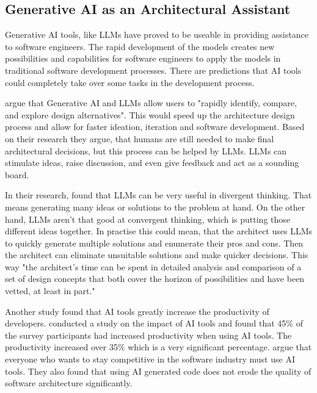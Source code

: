 \subsection{Generative AI as an Architectural Assistant}
Generative AI tools, like LLMs have proved to be useable in providing assistance to software engineers. The rapid development of the models creates new possibilities and capabilities for software engineers to apply the models in traditional software development processes. There are predictions that AI tools could completely take over some tasks in the development process. \parencite{welshEndProgramming2023}

\textcite{cervantesLLMsAssistantsSoftware2026} argue that Generative AI and LLMs allow users to "rapidly identify, compare, and explore design alternatives". This would speed up the architecture design process and allow for faster ideation, iteration and software development. Based on their research they argue, that humans are still needed to make final architectural decisions, but this process can be helped by LLMs. LLMs can stimulate ideas, raise discussion, and even give feedback and act as a sounding board.

In their research, \citeauthor{cervantesLLMsAssistantsSoftware2026} found that LLMs can be very useful in divergent thinking. That means generating many ideas or solutions to the problem at hand. On the other hand, LLMs aren't that good at convergent thinking, which is putting those different ideas together. In practise this could mean, that the architect uses LLMs to quickly generate multiple solutions and enumerate their pros and cons. Then the architect can eliminate unsuitable solutions and make quicker decisions. This way "the architect's time can be spent in detailed analysis and comparison of a set of design concepts that both cover the horizon of possibilities and have been vetted, at least in part."

Another study found that AI tools greatly increase the productivity of developers. \textcite{amasantiImpactAIGeneratedSolutions2026} conducted a study on the impact of AI tools and found that 45\% of the survey participants had increased productivity when using AI tools. The productivity increased over 35\% which is a very significant percentage. \citeauthor{amasantiImpactAIGeneratedSolutions2026} argue that everyone who wants to stay competitive in the software industry must use AI tools. They also found that using AI generated code does not erode the quality of software architecture significantly.

